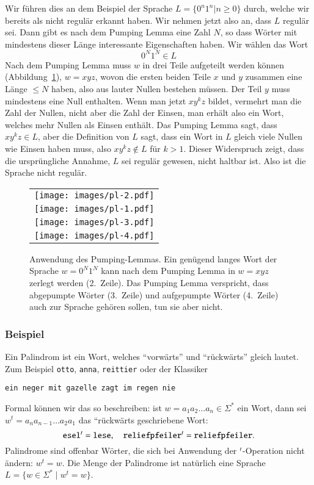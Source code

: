 \begin{beispiel}
Wir führen dies an dem Beispiel der Sprache $L=\{0^n1^n|n\ge 0\}$
durch, welche wir bereits als nicht regulär erkannt haben.
Wir nehmen jetzt also an, dass $L$ regulär sei.
Dann gibt es nach dem Pumping Lemma eine Zahl $N$, so dass Wörter mit
mindestens dieser Länge interessante Eigenschaften haben.
Wir wählen das Wort
\[
0^N1^N\in L
\]
Nach dem Pumping Lemma muss $w$ in drei Teile aufgeteilt werden können
(Abbildung~\ref{plimage}),
$w=xyz$,
wovon die ersten beiden Teile $x$ und $y$ zusammen eine Länge $\le N$
haben, also aus lauter Nullen bestehen müssen.
Der Teil $y$ muss mindestens eine Null enthalten.
Wenn man jetzt $xy^kz$ bildet, vermehrt man die Zahl der Nullen,
nicht aber die Zahl der Einsen, man erhält also ein Wort, welches
mehr Nullen als Einsen enthält.
Das Pumping Lemma sagt, dass $xy^kz\in L$, aber die Definition von $L$ sagt,
dass ein Wort in $L$ gleich viele Nullen wie Einsen haben muss, also
$xy^kz\not\in L$ für $k>1$.
Dieser Widerspruch zeigt, dass die ursprüngliche
Annahme, $L$ sei regulär gewesen, nicht haltbar ist.
Also ist die Sprache nicht regulär.
\begin{figure}
\begin{center}
\begin{tabular}{l}
\texttt{[image: images/pl-2.pdf]}\\
\texttt{[image: images/pl-1.pdf]}\\
\texttt{[image: images/pl-3.pdf]}\\
\texttt{[image: images/pl-4.pdf]}
\end{tabular}
\end{center}
\caption{Anwendung des Pumping-Lemmas.
Ein genügend langes Wort
der Sprache $w=0^N1^N$ kann nach dem Pumping Lemma in $w=xyz$ 
zerlegt werden (2.~Zeile).
Das Pumping Lemma verspricht, dass
abgepumpte Wörter (3.~Zeile) und aufgepumpte Wörter (4.~Zeile)
auch zur Sprache gehören sollen, tun sie aber nicht.
\label{plimage}}
\end{figure}
\end{beispiel}

\subsubsection{Beispiel}
Ein Palindrom ist ein Wort, welches ``vorwärts'' und ``rückwärts''
gleich lautet.
Zum Beispiel {\tt otto}, {\tt anna}, {\tt reittier} oder der
Klassiker
\begin{center}
{\tt ein neger mit gazelle zagt im regen nie}
\end{center}
Formal können wir das so beschreiben: ist $w=a_1a_2\dots a_n\in\Sigma^*$
ein Wort, dann sei $w^t=a_na_{n-1}\dots a_2a_1$ das ``rückwärts
geschriebene Wort:
\[
{\tt esel}^t={\tt lese},\quad {\tt reliefpfeiler}^t={\tt reliefpfeiler}.
\]
Palindrome sind offenbar Wörter, die sich bei Anwendung der
$\mathstrut^t$-Operation nicht ändern: $w^t=w$.
Die Menge der Palindrome
ist natürlich eine Sprache $L=\{w\in\Sigma^*\;|\;w^t=w\}$.

